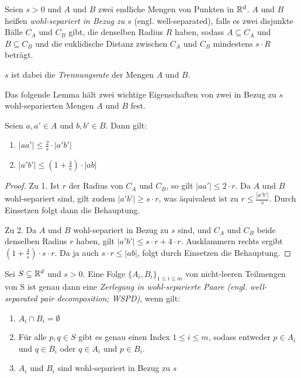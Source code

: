 \begin{definition}
   	\label{def:wellsep}
   	Seien $s > 0$ und $A$ und $B$ zwei endliche Mengen von Punkten in $\mathbb{R}^d$. 
   	$A$ und $B$ heißen \emph{wohl-separiert in Bezug zu $s$} (engl. well-separated), falls es zwei disjunkte Bälle $C_A$ und $C_B$ gibt, die denselben Radius $R$ haben, sodass $A \subseteq C_A$ und $B \subseteq C_B$ und die euklidische Distanz zwischen $C_A$ und $C_B$ mindestens $s\cdot R$ beträgt.

	$s$ ist dabei die \emph{Trennungsrate} der Mengen $A$ und $B$.
\end{definition}

Das folgende Lemma hält zwei wichtige Eigenschaften von zwei in Bezug zu $s$ wohl-separierten Mengen $A$ und $B$ fest.
\begin{lemma}
   	\label{lem:wellsep}
	Seien $a, a' \in A$ und $b, b' \in B$. Dann gilt:
	\begin{enumerate}
		\item $\displaystyle |aa'| \leq \frac{2}{s}\cdot|a'b'|$
		\item $\displaystyle |a'b'| \leq (1+\frac{4}{s})\cdot|ab|$
	\end{enumerate}
\end{lemma}
\begin{proof}
   	Zu 1. Ist $r$ der Radius von $C_A$ und $C_B$, so gilt $|aa'| \leq 2 \cdot r$. Da $A$ und $B$ wohl-separiert sind, gilt zudem $|a'b'| \geq s \cdot r$, was äquivalent ist zu $r \leq \frac{|a'b'|}{s}$. Durch Einsetzen folgt dann die Behauptung.
   	
   	Zu 2. Da $A$ und $B$ wohl-separiert in Bezug zu $s$ sind, und $C_A$ und $C_B$ beide denselben Radius $r$ haben, gilt $|a'b'| \leq s \cdot r + 4 \cdot r$. Ausklammern rechts ergibt $(1 + \frac{4}{s}) \cdot s \cdot r$. Da ja auch $s \cdot r \leq |ab|$, folgt durch Einsetzen die Behauptung.
\end{proof}

\begin{definition}[WSPD]
   	\label{def:wspd}
   	Sei $S \subseteq \mathbb{R}^d$ und $s > 0$. 
   	Eine Folge $\{A_i, B_i\}_{1 \leq i \leq m}$ von nicht-leeren Teilmengen von S ist genau dann eine \emph{Zerlegung in wohl-separierte Paare (engl. well-separated pair decomposition; WSPD)}, wenn gilt:
   	\begin{enumerate}[label={(\arabic*)}, itemsep=0mm]
   		\item $A_i \cap B_i = \emptyset$
   		\item Für alle $p, q \in S$ gibt es genau einen Index $1 \leq i \leq m$, sodass entweder $p \in A_i$ und $q \in B_i$ oder $q \in A_i$ und $p \in B_i$.
   		\item $A_i$ und $B_i$ sind wohl-separiert in Bezug zu $s$
   	\end{enumerate}
\end{definition}


